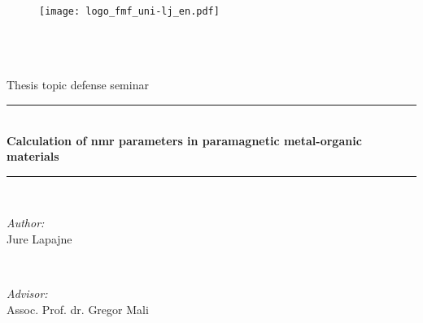 \begin{titlepage}

\begin{figure}[t]
    \centering
    \texttt{[image: logo\_fmf\_uni-lj\_en.pdf]}
\end{figure}    

\newcommand{\HRule}{\rule{\linewidth}{0.5mm}} %

\center %
 

\textsc{\LARGE }\\[0cm] %
\textsc{\Large }\\[0cm] %
\textsc{\large }\\[0cm] Thesis topic defense seminar    %


\HRule \\[0.4cm]
{ \huge \bfseries Calculation of nmr parameters in paramagnetic metal-organic materials}\\[0.4cm] %
\HRule \\[1.5cm]
 

\begin{minipage}{0.4\textwidth}
  \begin{flushleft} \large
   \raggedright
\emph{Author:}\\
Jure Lapajne \textsc{} %
\end{flushleft}
\end{minipage}
~
\begin{minipage}{0.45\textwidth}
  \begin{flushright} \large
    \raggedright
\emph{Advisor:} \\
Assoc. Prof. dr. Gregor Mali \textsc{} %
\end{flushright}
\end{minipage}\\[4cm]


\end{titlepage}
